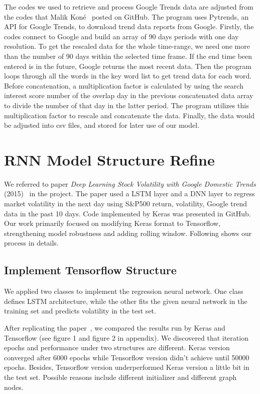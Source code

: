 \documentclass[11pt]{article}
\begin{document}
\vspace{5mm}

The codes we used to retrieve and process Google Trends data are adjusted from the codes that Malik Koné~\cite{bib2} posted on GitHub. The program uses Pytrends, an API for Google Trends, to download trend data reports from Google. Firstly, the codes connect to Google and build an array of 90 days periods with one day resolution. To get the rescaled data for the whole time-range, we need one more than the number of 90 days within the selected time frame. If the end time been entered is in the future, Google returns the most recent data. Then the program loops through all the words in the key word list to get trend data for each word. Before concatenation, a multiplication factor is calculated by using the search interest score number of the overlap day in the previous concatenated data array to divide the number of that day in the latter period. The program utilizes this multiplication factor to rescale and concatenate the data. Finally, the data would be adjusted into csv files, and stored for later use of our model.

\section{RNN Model Structure Refine}

We referred to paper \textit{Deep Learning Stock Volatility with Google Domestic Trends} (2015)~\cite{bib3} in the project. The paper used a LSTM layer and a DNN layer to regress market volatility in the next day using S\&P500 return, volatility, Google trend data in the past 10 days. Code implemented by Keras was presented in GitHub. Our work primarily focused on modifying Keras format to Tensorflow, strengthening model robustness and adding rolling window. Following shows our process in details.

\subsection{Implement Tensorflow Structure}

We applied two classes to implement  the regression neural network. One class defines LSTM architecture, while the other fits the given neural network in the training set and predicts volatility in the test set.

\vspace{5mm}

After replicating the paper~\cite{bib3}, we compared the results run by Keras and Tensorflow (see figure 1 and figure 2 in appendix). We discovered that iteration epochs and performance under two structures are different. Keras version converged after 6000 epochs while Tensorflow version didn't achieve until 50000 epochs. Besides, Tensorflow version underperformed Keras version a little bit in the test set. Possible reasons include different initializer and different graph nodes.
\end{document}
